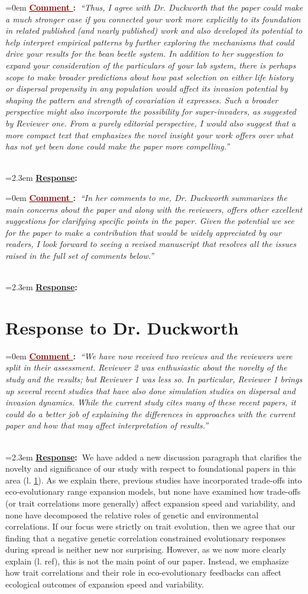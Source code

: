 \documentclass[12pt]{article}
\newcounter{cN}
\newcommand{\comment}[1]{
	\vspace{2em}
	\refstepcounter{cN} %
	\noindent \hangindent=0em \textbf{\textcolor{Maroon}{\uline{Comment \thecN}:~}}\emph{``#1''}
	}
\newcommand{\response}[1]{
	\\[0.25em]
	\hangindent=2.3em \textbf{\textcolor{NavyBlue}{\uline{Response}:~}}#1
	}
\begin{document}
\comment{Thus, I agree with Dr. Duckworth that the paper could make a much stronger case if you connected your work more explicitly to its foundation in related published (and nearly published) work and also developed its potential to help interpret empirical patterns by further exploring the mechanisms that could drive your results for the bean beetle system.
In addition to her suggestion to expand your consideration of the particulars of your lab system, there is perhaps scope to make broader predictions about how past selection on either life history or dispersal propensity in any population would affect its invasion potential by shaping the pattern and strength of covariation it expresses.
Such a broader perspective might also incorporate the possibility for super-invaders, as suggested by Reviewer one.
From a purely editorial perspective, I would also suggest that a more compact text that emphasizes the novel insight your work offers over what has not yet been done could make the paper more compelling.}
\response{}

\comment{In her comments to me, Dr. Duckworth summarizes the main concerns about the paper and along with the reviewers, offers other excellent suggestions for clarifying specific points in the paper.
Given the potential we see for the paper to make a contribution that would be widely appreciated by our readers, I look forward to seeing a revised manuscript that resolves all the issues raised in the full set of comments below.}
\response{}

\section{Response to Dr. Duckworth}
\vspace{-2em}

\comment{We have now received two reviews and the reviewers were split in their assessment. Reviewer 2 was enthusiastic about the novelty of the study and the results; but Reviewer 1 was less so.
In particular, Reviewer 1 brings up several recent studies that have also done simulation studies on dispersal and invasion dynamics.
While the current study cites many of these recent papers, it could do a better job of explaining the differences in approaches with the current paper and how that may affect interpretation of results.}
\response{We have added a new discussion paragraph that clarifies the novelty and significance of our study with respect to foundational papers in this area (l. \ref{}).
As we explain there, previous studies have incorporated trade-offs into eco-evolutionary range expansion models, but none have examined how trade-offs (or trait correlations more generally) affect expansion speed and variability, and none have decomposed the relative roles of genetic and environmental correlations.
If our focus were strictly on trait evolution, then we agree that our finding that a negative genetic correlation constrained evolutionary responses during spread is neither new nor surprising.
However, as we now more clearly explain (l. ref{}), this is not the main point of our paper.
Instead, we emphasize how trait correlations and their role in eco-evolutionary feedbacks can affect ecological outcomes of expansion speed and variability.}
\end{document}
